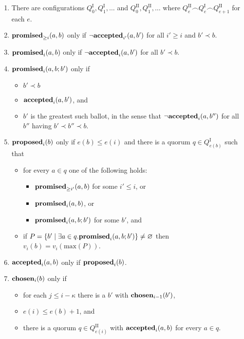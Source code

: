 \documentclass[journal]{IEEEtran}
\begin{document}
\begin{enumerate}

\item\label{paxos-quorums} There are configurations $Q^\textrm{I}_0,
Q^\textrm{I}_1, \ldots$ and $Q^\textrm{II}_0, Q^\textrm{II}_1, \ldots$ where
${Q^\textrm{II}_e \frown Q^\textrm{I}_e \frown Q^\textrm{II}_{e+1}}$ for each
$e$.

\item\label{paxos-mprom} $\mathbf{promised}_{\ge i}(a,b)$ only if $\neg\mathbf{accepted}_{i'}(a,b')$ for
all $i' \ge i$ and $b' \prec b$.

\item\label{paxos-fprom} $\mathbf{promised}_{i}(a,b)$ only if $\neg\mathbf{accepted}_{i}(a,b')$ for all
$b' \prec b$.

\item\label{paxos-bprom} $\mathbf{promised}_{i}(a,b;b')$ only if \begin{itemize} \item
$b' \prec b$ \item $\mathbf{accepted}_{i}(a,b')$, and \item $b'$ is the greatest such
ballot, in the sense that $\neg \mathbf{accepted}_{i}(a,b'')$ for all $b''$ having $b'
\prec b'' \prec b$. \end{itemize}

\item\label{paxos-prop} $\mathbf{proposed}_{i}(b)$ only if $e(b) \le e(i)$ and there is a
quorum $q \in Q^\textrm{I}_{e(b)}$ such that
\begin{itemize}
\item for every $a \in q$ one of the following holds:
%
\begin{itemize}
\item $\mathbf{promised}_{\ge i'}(a,b)$ for some $i' \le i$, or
\item $\mathbf{promised}_{i}(a,b)$, or
\item $\mathbf{promised}_{i}(a,b;b')$ for some $b'$, and
\end{itemize}

\item if $P = \{ b' \mid \exists a \in q. \mathbf{promised}_{i}(a,b;b') \} \ne
\varnothing$ then $v_i(b) = v_i(\mathrm{max}(P))$.

\end{itemize}

\item \label{paxos-acc} $\mathbf{accepted}_{i}(a,b)$ only if $\mathbf{proposed}_{i}(b)$.

\item \label{paxos-chosen} $\mathbf{chosen}_{i}(b)$ only if \begin{itemize} \item for
each $j \le i - \kappa$ there is a $b'$ with $\mathbf{chosen}_{i-1}(b')$, \item $e(i)
\le e(b) + 1$, and \item there is a quorum $q \in Q^\textrm{II}_{e(i)}$ with
$\mathbf{accepted}_{i}(a,b)$ for every $a \in q$.  \end{itemize}

\end{enumerate}
\end{document}
